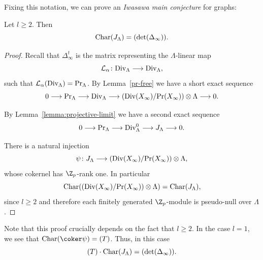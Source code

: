 Fixing this notation, we can prove an \emph{Iwasawa main conjecture} for graphs: 
\begin{thm} \label{thm:main_conjecture} 
	Let $l\ge 2$. Then 
	\[\textup{Char}(J_\Lambda)=(\det(\Delta_\infty)). \] 
\end{thm}
\begin{proof}
	Recall that $\Delta^t_\infty$ is the matrix representing the $\Lambda$-linear map 
	\[\mathcal{L}_\alpha \colon \textup{Div}_\Lambda \longrightarrow \textup{Div}_\Lambda, \]
	such that $\mathcal{L}_\alpha(\textup{Div}_\Lambda)=\textup{Pr}_\Lambda$. 
	By Lemma~\ref{pr-free} we have a short exact sequence 
	\[0\longrightarrow \textup{Pr}_\Lambda\longrightarrow \textup{Div}_\Lambda\longrightarrow (\textup{Div}(X_\infty)/\textup{Pr}(X_\infty))\otimes \Lambda\longrightarrow 0.\]
	
	By  Lemma~\ref{lemma:projective-limit} we have a second exact sequence  
	\[0\longrightarrow \textup{Pr}_\Lambda\longrightarrow \textup{Div}^0_\Lambda\longrightarrow J_\Lambda\longrightarrow 0.\]
	
	There is a natural injection
	\[\psi\colon J_\Lambda\longrightarrow (\textup{Div}(X_\infty)/\textup{Pr}(X_\infty))\otimes \Lambda,\]
	whose cokernel has $\Z_p$-rank one. In particular
	\[\textup{Char}((\textup{Div}(X_\infty)/\textup{Pr}(X_\infty))\otimes \Lambda)=\textup{Char}(J_\Lambda), \] 
	since ${l \ge 2}$ and therefore each finitely generated $\Z_p$-module is pseudo-null over $\Lambda$. 
\end{proof}
\begin{rema} \label{rem:main_conjecture} 
	Note that this proof crucially depends on the fact that $l\ge 2$. In the case $l=1$, we see that ${\textup{Char}(\coker \psi)=(T)}$. Thus, in this case
	\[(T) \cdot \textup{Char}(J_\Lambda)= (\det(\Delta_\infty)).\]
\end{rema}
